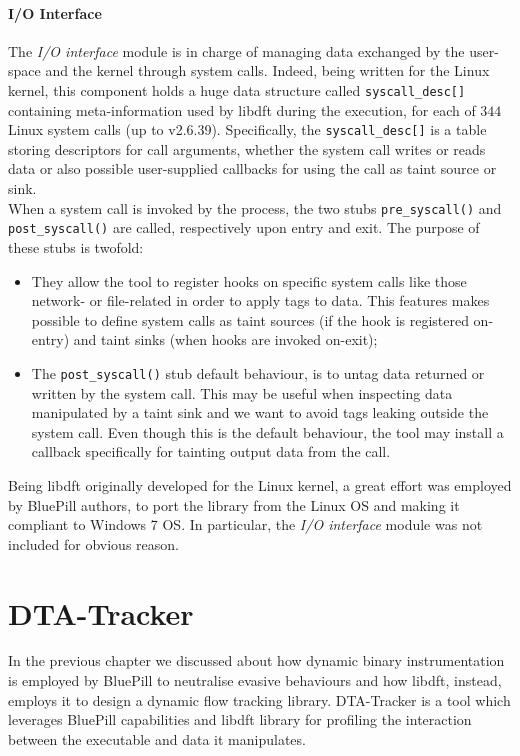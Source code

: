 \documentclass[LaM,binding=0.6cm]{sapthesis}
\begin{document}
\subsubsection{I/O Interface}
The \textit{I/O interface} module is in charge of managing data exchanged by the user-space and the kernel through system calls. Indeed, being written for the Linux kernel, this component holds a huge data structure called \texttt{syscall\_desc[]} containing meta-information used by libdft during the execution, for each of $344$ Linux system calls (up to v2.6.39). Specifically, the \texttt{syscall\_desc[]} is a table storing descriptors for call arguments, whether the system call writes or reads data or also possible user-supplied callbacks for using the call as taint source or sink.\\
When a system call is invoked by the process, the two stubs \texttt{pre\_syscall()} and \texttt{post\_syscall()} are called, respectively upon entry and exit. The purpose of these stubs is twofold:
\begin{itemize}
\item They allow the tool to register hooks on specific system calls like those network- or file-related in order to apply tags to data. This features makes possible to define system calls as taint sources (if the hook is registered on-entry) and taint sinks (when hooks are invoked on-exit);
\item The \texttt{post\_syscall()} stub default behaviour, is to untag data returned or written by the system call. This may be useful when inspecting data manipulated by a taint sink and we want to avoid tags leaking outside the system call. Even though this is the default behaviour, the tool may install a callback specifically for tainting output data from the call.
\end{itemize}

Being libdft originally developed for the Linux kernel, a great effort was employed by BluePill authors, to port the library from the Linux OS and making it compliant to Windows 7 OS. In particular, the \textit{I/O interface} module was not included for obvious reason.

\chapter{DTA-Tracker}
\label{ch:dta-tracker}
In the previous chapter we discussed about how dynamic binary instrumentation is employed by BluePill to neutralise evasive behaviours and how libdft, instead, employs it to design a dynamic flow tracking library. DTA-Tracker is a tool which leverages BluePill capabilities and libdft library for profiling the interaction between the executable and data it manipulates.\\
\end{document}
